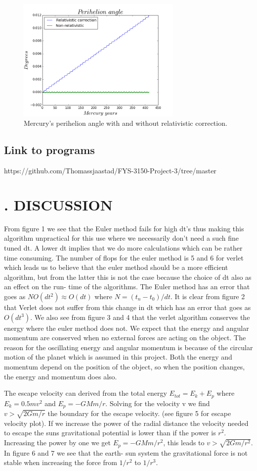 \documentclass[twocolumn]{article}
\begin{document}
\begin{figure}[H]
\centering
\includegraphics[width=8cm]{perihelion.png}
\caption{Mercury's perihelion angle with and without relativistic correction.}
\end{figure}
\subsection*{Link to programs}
https://github.com/Thomassjaastad/FYS-3150-Project-3/tree/master
\section*{. DISCUSSION} 
From figure 1 we see that the Euler method fails for high dt's thus making this algorithm unpractical for this use where we necessarily don't need a such fine tuned dt. A lower dt implies that we do more calculations which can be rather time consuming. The number of flops for the euler method is 5 and 6 for verlet which leads us to believe that the euler method should be a more efficient algorithm, but from the latter this is not the case because the choice of dt also as an effect on the run- time of the algorithms. The Euler method has an error that goes as $NO(dt^2) \approx O(dt)$ where $N = (t_n - t_0)/dt$. It is clear from figure 2 that Verlet does not suffer from this change in dt which has an error that goes as $O(dt^3)$. We also see from figure 3 and 4 that the verlet algorithm conserves the energy where the euler method does not. We expect that the energy and angular momentum are conserved when no external forces are acting on the object. The reason for the oscillating energy and angular momentum is because of the circular motion of the planet which is assumed in this project. Both the energy and momentum depend on the position of the object, so when the position changes, the energy and momentum does also.  

The escape velocity can derived from the total energy $E_{tot} = E_k + E_p$ where $E_k = 0.5mv^2$ and $E_p = -GMm/r$. Solving for the velocity v we find $v > \sqrt{2Gm/r}$ the boundary for the escape velocity. (see figure 5 for escape velocity plot). If we increase the power of the radial distance the velocity needed to escape the suns gravitational potential is lower than if the power is $r^2$. Increasing the power by one we get $E_p = -GMm/r^2$, this leads to $v > \sqrt{2Gm/r^2}$. In figure 6 and 7 we see that the earth- sun system the gravitational force is not stable when increasing the force from $1/r^2$ to $1/r^3$.    
\end{document}
